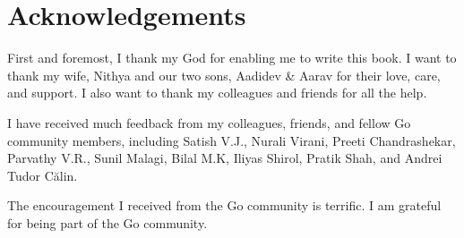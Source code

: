 \cleardoublepage
{}
\chapter*{Acknowledgements}

First and foremost, I thank my God for enabling me to write this book.
I want to thank my wife, Nithya and our two sons, Aadidev \& Aarav for
their love, care, and support.  I also want to thank my colleagues and
friends for all the help.

I have received much feedback from my colleagues, friends, and fellow
Go community members, including Satish V.J., Nurali Virani, Preeti
Chandrashekar, Parvathy V.R., Sunil Malagi, Bilal M.K, Iliyas Shirol,
Pratik Shah, and Andrei Tudor Călin.

The encouragement I received from the Go community is terrific.  I am
grateful for being part of the Go community.
